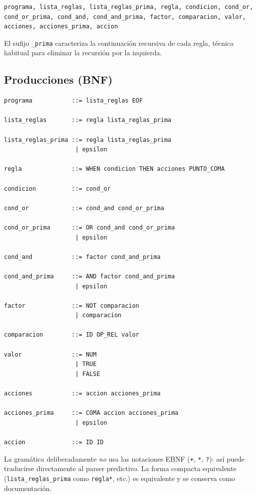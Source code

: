 \documentclass[12pt,a4paper]{article}
\begin{document}
\begin{lstlisting}
programa, lista_reglas, lista_reglas_prima, regla, condicion, cond_or,
cond_or_prima, cond_and, cond_and_prima, factor, comparacion, valor,
acciones, acciones_prima, accion
\end{lstlisting}

El sufijo \texttt{\_prima} caracteriza la continuación recursiva de cada
regla, técnica habitual para eliminar la recursión por la izquierda.

\subsection{Producciones (BNF)}
\begin{lstlisting}
programa           ::= lista_reglas EOF

lista_reglas       ::= regla lista_reglas_prima

lista_reglas_prima ::= regla lista_reglas_prima
                    | epsilon

regla              ::= WHEN condicion THEN acciones PUNTO_COMA

condicion          ::= cond_or

cond_or            ::= cond_and cond_or_prima

cond_or_prima      ::= OR cond_and cond_or_prima
                    | epsilon

cond_and           ::= factor cond_and_prima

cond_and_prima     ::= AND factor cond_and_prima
                    | epsilon

factor             ::= NOT comparacion
                    | comparacion

comparacion        ::= ID OP_REL valor

valor              ::= NUM
                    | TRUE
                    | FALSE

acciones           ::= accion acciones_prima

acciones_prima     ::= COMA accion acciones_prima
                    | epsilon

accion             ::= ID ID
\end{lstlisting}

La gramática deliberadamente \emph{no} usa las notaciones EBNF
(\texttt{+}, \texttt{*}, \texttt{?}): así puede traducirse directamente al
parser predictivo. La forma compacta equivalente
(\texttt{lista\_reglas\_prima} como \texttt{regla*}, etc.) es equivalente y
se conserva como documentación.
\end{document}
